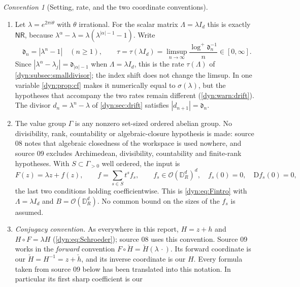 \documentclass[11pt,letterpaper]{article}
\theoremstyle{definition}
\theoremstyle{remark}
\newtheorem{convention}[convention]{Convention}
\newcommand{\OO}{\mathcal O}
\newcommand{\nres}{\mathsf{NR}}
\numberwithin{equation}{section}
\begin{document}
\begin{convention}[Setting, rate, and the two coordinate conventions]
\label{dyn:esm:conv}
\begin{enumerate}[label=(\roman*)]
\item Let $\lambda=e^{2\pi i\theta}$ with $\theta$ irrational. For the scalar
matrix $\Lambda=\lambda I_d$ this is exactly $\nres$, because
$\lambda^{\alpha}-\lambda=\lambda(\lambda^{|\alpha|-1}-1)$. Write
\begin{equation}\label{dyn:esm:eq:rate}
 \mathfrak d_n=|\lambda^{n}-1|\quad(n\ge1),\qquad
 \tau=\tau(\lambda I_d)=\limsup_{n\to\infty}
 \frac{\log^{+}\mathfrak d_n^{-1}}{n}\in[0,\infty].
\end{equation}
Since $|\lambda^{\alpha}-\lambda_j|=\mathfrak d_{|\alpha|-1}$ when
$\Lambda=\lambda I_d$, this is the rate $\tau(\Lambda)$ of
\cref{dyn:subsec:smalldivisor}; the index shift does not change the limsup.
In one variable \cref{dyn:prop:cf} makes it numerically equal to
$\sigma(\lambda)$, but the hypotheses that accompany the two rates remain
different (\cref{dyn:warn:drift}). The divisor $d_n=\lambda^{n}-\lambda$ of
\cref{dyn:sec:drift} satisfies $|d_{n+1}|=\mathfrak d_n$.
\item The value group $\Gamma$ is any nonzero set-sized ordered abelian
group. No divisibility, rank, countability or algebraic-closure hypothesis
is made: source 08 notes that algebraic closedness of the workspace is used
nowhere, and source 09 excludes Archimedean, divisibility, countability and
finite-rank hypotheses. With $S\subset\Gamma_{>0}$ well ordered, the input is
\begin{equation}\label{dyn:esm:eq:input}
 F(z)=\lambda z+f(z),\qquad f=\sum_{s\in S}t^{s}f_s,\qquad
 f_s\in\OO(\mathbb D_R^{d})^{d},\quad f_s(0)=0,\quad \mathrm Df_s(0)=0,
\end{equation}
the last two conditions holding coefficientwise. This is
\eqref{dyn:eq:Fintro} with $\Lambda=\lambda I_d$ and
$B=\OO(\mathbb D_R^{d})$. No common bound on the sizes of the $f_s$ is
assumed.
\item \emph{Conjugacy convention.} As everywhere in this report,
$H=z+h$ and $H\circ F=\lambda H$ (\eqref{dyn:eq:Schroeder}); source 08
uses this convention. Source 09 works in the \emph{forward} convention
$F\circ\check H=\check H(\lambda\,\cdot)$. Its forward coordinate is our
$\check H=H^{-1}=z+\check h$, and its inverse coordinate is our $H$.
Every formula taken from source 09 below has been translated into this
notation. In particular its first sharp coefficient is our

\end{enumerate}
\end{convention}
\end{document}
